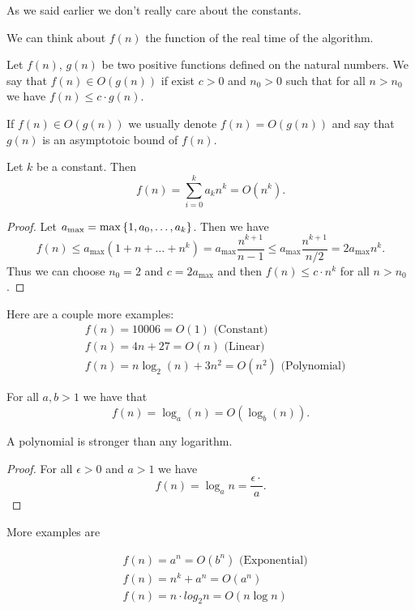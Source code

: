 \documentclass[11pt,a4paper]{article}
\begin{document}
As we said earlier we don't really care about the constants.

We can think about $f(n)$ the function of the real time of the algorithm.

\begin{definition}
    Let $f(n)$, $g(n)$ be two positive functions defined on the natural
    numbers.
    We say that $f(n) \in O(g(n))$ if exist $c > 0$ and $n_0 > 0$ such
    that for all $n > n_0$ we have $f(n) \le c \cdot g(n)$.
\end{definition}

If $f(n) \in O(g(n))$ we usually denote $f(n) = O(g(n))$ and say that
$g(n)$ is an asymptotoic bound of $f(n)$.

\begin{proposition}
    Let $k$ be a constant. Then
    \[
        f(n) = \sum_{i=0}^{k} a_k n^k = O(n^k).
    \]
\end{proposition}
\begin{proof}
    Let $a_{\max} = \max\set{1,a_0,\dots,a_k}$.
    Then we have
    \[
        f(n) \le a_{\max}(1 + n + \dots + n^k) =
        a_{\max} \frac{n^{k+1}}{n-1} \le
        a_{\max} \frac{n^{k+1}}{n/2} = 2 a_{\max} n^k.
    \]
    Thus we can choose $n_0 = 2$ and $c = 2 a_{\max}$ and then
    $f(n) \le c \cdot n^k$ for all $n > n_0$.
\end{proof}

Here are a couple more examples:
\begin{align*}
    &f(n) = 10006 = O(1) \text{ (Constant)} \\
    &f(n) = 4n + 27 =O(n) \text{ (Linear)} \\
    &f(n) = n \log_2(n) + 3n^2 = O(n^2) \text{ (Polynomial)}
\end{align*}

\begin{proposition}
    For all $a,b > 1$ we have that
    \[
        f(n) = \log_a(n) = O(\log_b(n)).
    \]
\end{proposition}

A polynomial is stronger than any logarithm.

\begin{proof}
    For all $\epsilon > 0$ and $a > 1$ we have
    \[ f(n) = \log_a n = \frac{\epsilon \cdot}{a}. \]
\end{proof}

More examples are

\begin{align*}
    &f(n) = a^n = O(b^n) \text{ (Exponential)} \\
    &f(n) = n^k + a^n = O(a^n) \\
    &f(n) = n \cdot log_2 n = O(n \log n)
\end{align*}
\end{document}
